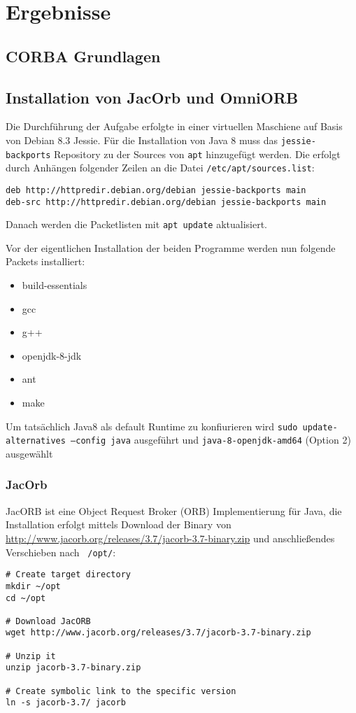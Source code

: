 
\section{Ergebnisse}
\label{sec:Ergebnisse}

\subsection{CORBA Grundlagen}

\subsection{Installation von JacOrb und OmniORB}
Die Durchf\"uhrung der Aufgabe erfolgte in einer virtuellen Maschiene auf Basis von Debian 8.3 Jessie.
F\"ur die Installation von Java 8 muss das \texttt{jessie-backports} Repository zu der Sources von \texttt{apt} hinzugef\"ugt werden.
Die erfolgt durch Anh\"angen folgender Zeilen an die Datei \texttt{/etc/apt/sources.list}:

\texttt{deb http://httpredir.debian.org/debian jessie-backports main\\
deb-src http://httpredir.debian.org/debian jessie-backports main}

Danach werden die Packetlisten mit \texttt{apt update} aktualisiert.

Vor der eigentlichen Installation der beiden Programme werden nun folgende Packets installiert:
\begin{itemize}
    \item build-essentials
    \item gcc
    \item g++
    \item openjdk-8-jdk
    \item ant
    \item make
\end{itemize}

Um tats\"achlich Java8 als default Runtime zu konfiurieren wird \texttt{sudo update-alternatives --config java} ausgef\"uhrt und \texttt{java-8-openjdk-amd64} (Option 2) ausgew\"ahlt

\subsubsection{JacOrb}
JacORB ist eine Object Request Broker (ORB) Implementierung f\"ur Java, die Installation erfolgt mittels Download der Binary von \url{http://www.jacorb.org/releases/3.7/jacorb-3.7-binary.zip} und anschlie\ss endes Verschieben nach \texttt{~/opt/}:
\begin{lstlisting}[caption=Installation von JacORB]
# Create target directory
mkdir ~/opt
cd ~/opt

# Download JacORB
wget http://www.jacorb.org/releases/3.7/jacorb-3.7-binary.zip

# Unzip it
unzip jacorb-3.7-binary.zip

# Create symbolic link to the specific version
ln -s jacorb-3.7/ jacorb
\end{lstlisting}

